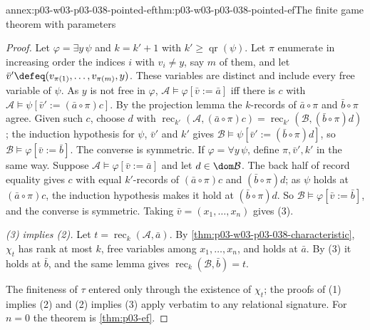 \begin{annexitem}{annex:p03-w03-p03-038-pointed-ef}{thm:p03-w03-p03-038-pointed-ef}{The finite game theorem with parameters}
\begin{proof}
Let \(\varphi=\exists y\,\psi\) and \(k=k'+1\) with \(k'\ge\operatorname{qr}(\psi)\).
Let \(\pi\) enumerate in increasing order the indices \(i\) with \(v_i\ne y\),
say \(m\) of them, and let \(\bar v'\defeq(v_{\pi(1)},\ldots,v_{\pi(m)},y)\).
These variables are distinct and include every free variable of \(\psi\). As
\(y\) is not free in \(\varphi\), \(\mathcal A\models\varphi[\bar v:=\bar a]\)
iff there is \(c\) with \(\mathcal A\models\psi[\bar v':=(\bar a\circ\pi)c]\).
By the projection lemma the \(k\)-records of \(\bar a\circ\pi\) and
\(\bar b\circ\pi\) agree. Given such \(c\), choose \(d\) with
\(\operatorname{rec}_{k'}(\mathcal A,(\bar a\circ\pi)c)=
\operatorname{rec}_{k'}(\mathcal B,(\bar b\circ\pi)d)\); the induction
hypothesis for \(\psi\), \(\bar v'\) and \(k'\) gives
\(\mathcal B\models\psi[\bar v':=(\bar b\circ\pi)d]\), so
\(\mathcal B\models\varphi[\bar v:=\bar b]\). The converse is symmetric. If
\(\varphi=\forall y\,\psi\), define \(\pi,\bar v',k'\) in the same way. Suppose
\(\mathcal A\models\varphi[\bar v:=\bar a]\) and let \(d\in\dom\mathcal B\).
The back half of record equality gives \(c\) with equal \(k'\)-records of
\((\bar a\circ\pi)c\) and \((\bar b\circ\pi)d\); as \(\psi\) holds at
\((\bar a\circ\pi)c\), the induction hypothesis makes it hold at
\((\bar b\circ\pi)d\). So \(\mathcal B\models\varphi[\bar v:=\bar b]\), and the
converse is symmetric. Taking \(\bar v=(x_1,\ldots,x_n)\) gives (3).

\emph{(3) implies (2).} Let \(t=\operatorname{rec}_k(\mathcal A,\bar a)\). By
\cref{thm:p03-w03-p03-038-characteristic}, \(\chi_t\) has rank at most \(k\),
free variables among \(x_1,\ldots,x_n\), and holds at \(\bar a\). By (3) it
holds at \(\bar b\), and the same lemma gives
\(\operatorname{rec}_k(\mathcal B,\bar b)=t\).

The finiteness of \(\tau\) entered only through the existence of \(\chi_t\);
the proofs of (1) implies (2) and (2) implies (3) apply verbatim to any
relational signature. For \(n=0\) the theorem is \cref{thm:p03-ef}.
\end{proof}
\end{annexitem}

